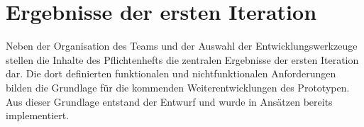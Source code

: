 \section{Ergebnisse der ersten Iteration}
Neben der Organisation des Teams und der Auswahl der Entwicklungswerkzeuge stellen die Inhalte des Pflichtenhefts die zentralen Ergebnisse der ersten Iteration dar. Die dort definierten funktionalen und nichtfunktionalen Anforderungen bilden die Grundlage für die kommenden Weiterentwicklungen des Prototypen. Aus dieser Grundlage entstand der Entwurf und wurde in Ansätzen bereits implementiert.